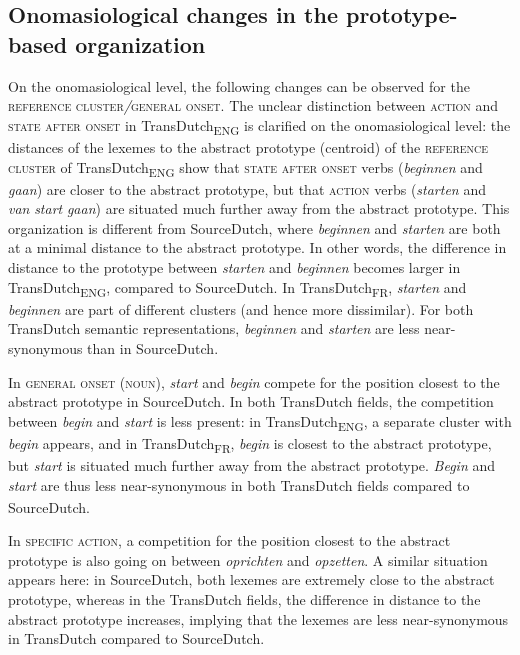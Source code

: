 \subsection{Onomasiological changes in the prototype-based organization}
\label{sec:4.5.2}  
On the onomasiological level, the following changes can be observed for the \textsc{reference cluster}\textit{/}\textsc{general onset}. The unclear distinction between \textsc{action} and \textsc{state after onset} in TransDutch\textsubscript{ENG} is clarified on the onomasiological level: the distances of the lexemes to the abstract prototype (centroid) of the \textsc{reference cluster} of TransDutch\textsubscript{ENG} show that \textsc{state after onset} verbs (\textit{beginnen} and \textit{gaan}) are closer to the abstract prototype, but that \textsc{action} verbs (\textit{starten} and \textit{van} \textit{start} \textit{gaan}) are situated much further away from the abstract prototype. This organization is different from SourceDutch, where \textit{beginnen} and \textit{starten} are both at a minimal distance to the abstract prototype. In other words, the difference in distance to the prototype between \textit{starten} and \textit{beginnen} becomes larger in TransDutch\textsubscript{ENG}, compared to SourceDutch. In TransDutch\textsubscript{FR}, \textit{starten} and \textit{beginnen} are part of different clusters (and hence more dissimilar). For both TransDutch semantic representations, \textit{beginnen} and \textit{starten} are less near-synonymous than in SourceDutch.

In \textsc{general onset} (\textsc{noun}), \textit{start} and \textit{begin} compete for the position closest to the abstract prototype in SourceDutch. In both TransDutch fields, the competition between \textit{begin} and \textit{start} is less present: in TransDutch\textsubscript{ENG}, a separate cluster with \textit{begin} appears, and in TransDutch\textsubscript{FR}, \textit{begin} is closest to the abstract prototype, but \textit{start} is situated much further away from the abstract prototype. \textit{Begin} and \textit{start} are thus less near-synonymous in both TransDutch\textsubscript{} fields compared to SourceDutch.

In {\textsc{specific}} \textsc{action}, a competition for the position closest to the abstract prototype is also going on between \textit{oprichten} and \textit{opzetten}. A similar situation appears here: in SourceDutch, both lexemes are extremely close to the abstract prototype, whereas in the TransDutch fields, the difference in distance to the abstract prototype increases, implying that the lexemes are less near-synonymous in TransDutch compared to SourceDutch.

